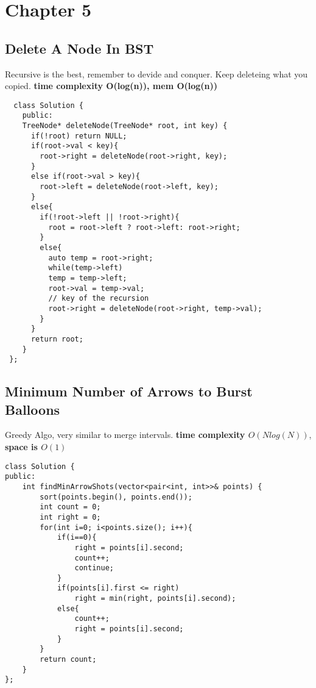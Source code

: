 \section{Chapter 5}


\subsection{Delete A Node In BST}
Recursive is the best, remember to devide and conquer. Keep deleteing what you copied. {\color{blue} \textbf{time complexity O(log(n)), mem O(log(n))}}
\begin{lstlisting}
  class Solution {
    public:
    TreeNode* deleteNode(TreeNode* root, int key) {
      if(!root) return NULL;
      if(root->val < key){
        root->right = deleteNode(root->right, key);
      }
      else if(root->val > key){
        root->left = deleteNode(root->left, key);
      }
      else{
        if(!root->left || !root->right){
          root = root->left ? root->left: root->right;
        }
        else{
          auto temp = root->right;
          while(temp->left)
          temp = temp->left;
          root->val = temp->val;
          // key of the recursion
          root->right = deleteNode(root->right, temp->val);
        }
      }
      return root;
    }
 };
\end{lstlisting}




\subsection{Minimum Number of Arrows to Burst Balloons}
Greedy Algo, very similar to merge intervals. {\color{blue}\textbf{time complexity $O(Nlog(N))$}}, {\color{blue}\textbf{space is $O(1)$}}

\begin{lstlisting}
class Solution {
public:
    int findMinArrowShots(vector<pair<int, int>>& points) {
        sort(points.begin(), points.end());
        int count = 0;
        int right = 0;
        for(int i=0; i<points.size(); i++){
            if(i==0){
                right = points[i].second;
                count++;
                continue;
            }
            if(points[i].first <= right)
                right = min(right, points[i].second);
            else{
                count++;
                right = points[i].second;
            }
        }
        return count;
    }
};
\end{lstlisting}



